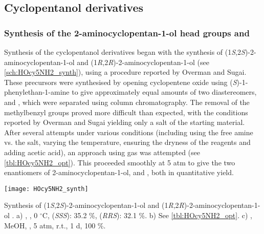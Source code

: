 \subsection{Cyclopentanol derivatives\label{sec:HOcy5}}

\subsubsection{Synthesis of the 2-aminocyclopentan-1-ol head groups  and  \label{sec:HOcy5NH2}}

Synthesis of the cyclopentanol derivatives began with the synthesis of (1\textit{S},2\textit{S})-2-aminocyclopentan-1-ol  and (1\textit{R},2\textit{R})-2-aminocyclopentan-1-ol  (see \ref{sch:HOcy5NH2_synth}), using a procedure reported by Overman and Sugai\cite{Aube1992,Overman1985,Overman1985a}.
These precursors were synthesised by opening cyclopentene oxide  using (\textit{S})-1-phenylethan-1-amine  to give approximately equal amounts of two diastereomers,  and , which were separated using column chromatography. 
The removal of the methylbenzyl groups proved more difficult than expected, with the conditions reported by Overman and Sugai\cite{Overman1985} yielding only a salt of the starting material.
After several attempts under various conditions (including using the free amine vs. the salt, varying the temperature, ensuring the dryness of the reagents and adding acetic acid), an approach using  gas was attempted (see \ref{tbl:HOcy5NH2_opt}). This proceeded smoothly at 5 atm to give the two enantiomers of 2-aminocyclopentan-1-ol,  and , both in quantitative yield.

\begin{scheme}[H]
	\begin{center}
		\texttt{[image: HOcy5NH2\_synth]}
		\caption{Synthesis of (1\textit{S},2\textit{S})-2-aminocyclopentan-1-ol  and (1\textit{R},2\textit{R})-2-aminocyclopentan-1-ol .
		a) , , 0 $^\circ$C,  
		 (\textit{SSS}): 35.2 \%,
		 (\textit{RRS}): 32.1 \%.
		b) See \ref{tbl:HOcy5NH2_opt}.
		c) , MeOH, , 5 atm, r.t., 1 d, 100 \%.
		\label{sch:HOcy5NH2_synth}}
	\end{center}
\end{scheme}


